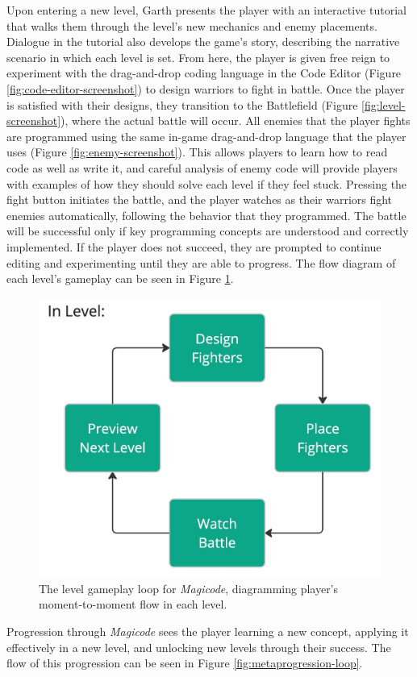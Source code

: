 \documentclass[10pt,twocolumn]{article}
\begin{document}
Upon entering a new level, Garth presents the player with an interactive tutorial that walks them through the level’s new mechanics and enemy placements. Dialogue in the tutorial also develops the game’s story, describing the narrative scenario in which each level is set. From here, the player is given free reign to experiment with the drag-and-drop coding language in the Code Editor (Figure \ref{fig:code-editor-screenshot}) to design warriors to fight in battle. Once the player is satisfied with their designs, they transition to the Battlefield (Figure \ref{fig:level-screenshot}), where the actual battle will occur. All enemies that the player fights are programmed using the same in-game drag-and-drop language that the player uses (Figure \ref{fig:enemy-screenshot}). This allows players to learn how to read code as well as write it, and careful analysis of enemy code will provide players with examples of how they should solve each level if they feel stuck. Pressing the fight button initiates the battle, and the player watches as their warriors fight enemies automatically, following the behavior that they programmed. The battle will be successful only if key programming concepts are understood and correctly implemented. If the player does not succeed, they are prompted to continue editing and experimenting until they are able to progress. The flow diagram of each level’s gameplay can be seen in Figure \ref{fig:level-loop}.

\begin{figure}
    \centering
    \includegraphics[width=.7\linewidth]{images/level-loop.jpeg}
    \caption{The level gameplay loop for \textit{Magicode}, diagramming player's moment-to-moment flow in each level.}
    \label{fig:level-loop}
\end{figure}

Progression through \textit{Magicode} sees the player learning a new concept, applying it effectively in a new level, and unlocking new levels through their success. The flow of this progression can be seen in Figure \ref{fig:metaprogression-loop}.
\end{document}
